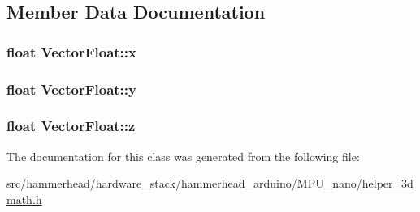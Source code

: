 \subsection{Member Data Documentation}
\subsubsection[{\texorpdfstring{x}{x}}]{\setlength{\rightskip}{0pt plus 5cm}float Vector\+Float\+::x}\hypertarget{classVectorFloat_a2d8e5159f045ca977769d168af75320c}{}\label{classVectorFloat_a2d8e5159f045ca977769d168af75320c}
\subsubsection[{\texorpdfstring{y}{y}}]{\setlength{\rightskip}{0pt plus 5cm}float Vector\+Float\+::y}\hypertarget{classVectorFloat_a4affe2a9de97600b3d8df98586679e14}{}\label{classVectorFloat_a4affe2a9de97600b3d8df98586679e14}
\subsubsection[{\texorpdfstring{z}{z}}]{\setlength{\rightskip}{0pt plus 5cm}float Vector\+Float\+::z}\hypertarget{classVectorFloat_a54b8e4234e3b48e106d090570755f107}{}\label{classVectorFloat_a54b8e4234e3b48e106d090570755f107}


The documentation for this class was generated from the following file\+:\begin{DoxyCompactItemize}
\item 
src/hammerhead/hardware\+\_\+stack/hammerhead\+\_\+arduino/\+M\+P\+U\+\_\+nano/\hyperlink{helper__3dmath_8h}{helper\+\_\+3dmath.\+h}\end{DoxyCompactItemize}
